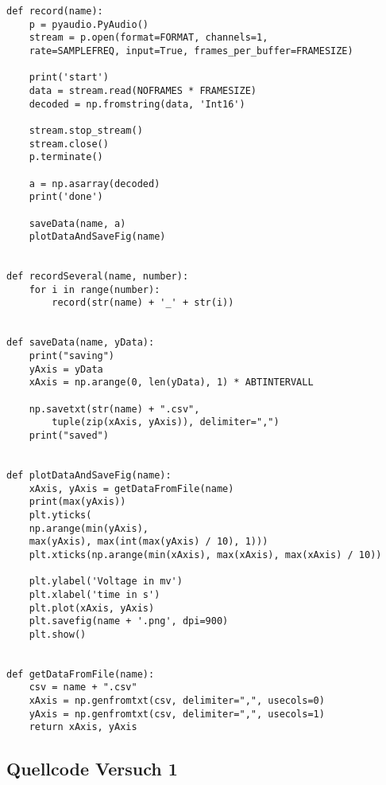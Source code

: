 \documentclass[12pt, oneside, a4paper, \docLanguage]{report}
\begin{document}
\begin{verbatim}
def record(name):
    p = pyaudio.PyAudio()
    stream = p.open(format=FORMAT, channels=1, 
    rate=SAMPLEFREQ, input=True, frames_per_buffer=FRAMESIZE)

    print('start')
    data = stream.read(NOFRAMES * FRAMESIZE)
    decoded = np.fromstring(data, 'Int16')

    stream.stop_stream()
    stream.close()
    p.terminate()

    a = np.asarray(decoded)
    print('done')

    saveData(name, a)
    plotDataAndSaveFig(name)


def recordSeveral(name, number):
    for i in range(number):
        record(str(name) + '_' + str(i))


def saveData(name, yData):
    print("saving")
    yAxis = yData
    xAxis = np.arange(0, len(yData), 1) * ABTINTERVALL

    np.savetxt(str(name) + ".csv", 
    	tuple(zip(xAxis, yAxis)), delimiter=",")
    print("saved")


def plotDataAndSaveFig(name):
    xAxis, yAxis = getDataFromFile(name)
    print(max(yAxis))
    plt.yticks(
    np.arange(min(yAxis), 
    max(yAxis), max(int(max(yAxis) / 10), 1)))
    plt.xticks(np.arange(min(xAxis), max(xAxis), max(xAxis) / 10))

    plt.ylabel('Voltage in mv')
    plt.xlabel('time in s')
    plt.plot(xAxis, yAxis)
    plt.savefig(name + '.png', dpi=900)
    plt.show()


def getDataFromFile(name):
    csv = name + ".csv"
    xAxis = np.genfromtxt(csv, delimiter=",", usecols=0)
    yAxis = np.genfromtxt(csv, delimiter=",", usecols=1)
    return xAxis, yAxis

\end{verbatim}

\subsection{Quellcode Versuch 1}
\label{chap:APPENDIX_SOURCECODE_V1}
\end{document}
